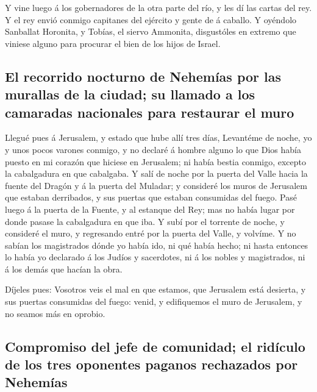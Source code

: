 Y vine luego á los gobernadores de la otra parte del río,
y les dí las cartas del rey. Y el rey envió conmigo capitanes del
ejército y gente de á caballo.  Y oyéndolo Sanballat
Horonita, y Tobías, el siervo Ammonita, disgustóles en extremo que
viniese alguno para procurar el bien de los hijos de Israel.

\hypertarget{el-recorrido-nocturno-de-nehemuxedas-por-las-murallas-de-la-ciudad-su-llamado-a-los-camaradas-nacionales-para-restaurar-el-muro}{%
\subsection{El recorrido nocturno de Nehemías por las murallas de la
ciudad; su llamado a los camaradas nacionales para restaurar el
muro}\label{el-recorrido-nocturno-de-nehemuxedas-por-las-murallas-de-la-ciudad-su-llamado-a-los-camaradas-nacionales-para-restaurar-el-muro}}

 Llegué pues á Jerusalem, y estado que hube allí tres
días,  Levantéme de noche, yo y unos pocos varones
conmigo, y no declaré á hombre alguno lo que Dios había puesto en mi
corazón que hiciese en Jerusalem; ni había bestia conmigo, excepto la
cabalgadura en que cabalgaba.  Y salí de noche por la
puerta del Valle hacia la fuente del Dragón y á la puerta del Muladar; y
consideré los muros de Jerusalem que estaban derribados, y sus puertas
que estaban consumidas del fuego.  Pasé luego á la puerta
de la Fuente, y al estanque del Rey; mas no había lugar por donde pasase
la cabalgadura en que iba.  Y subí por el torrente de
noche, y consideré el muro, y regresando entré por la puerta del Valle,
y volvíme.  Y no sabían los magistrados dónde yo había
ido, ni qué había hecho; ni hasta entonces lo había yo declarado á los
Judíos y sacerdotes, ni á los nobles y magistrados, ni á los demás que
hacían la obra.

 Díjeles pues: Vosotros veis el mal en que estamos, que
Jerusalem está desierta, y sus puertas consumidas del fuego: venid, y
edifiquemos el muro de Jerusalem, y no seamos más en oprobio.

\hypertarget{compromiso-del-jefe-de-comunidad-el-riduxedculo-de-los-tres-oponentes-paganos-rechazados-por-nehemuxedas}{%
\subsection{Compromiso del jefe de comunidad; el ridículo de los tres
oponentes paganos rechazados por
Nehemías}\label{compromiso-del-jefe-de-comunidad-el-riduxedculo-de-los-tres-oponentes-paganos-rechazados-por-nehemuxedas}}

